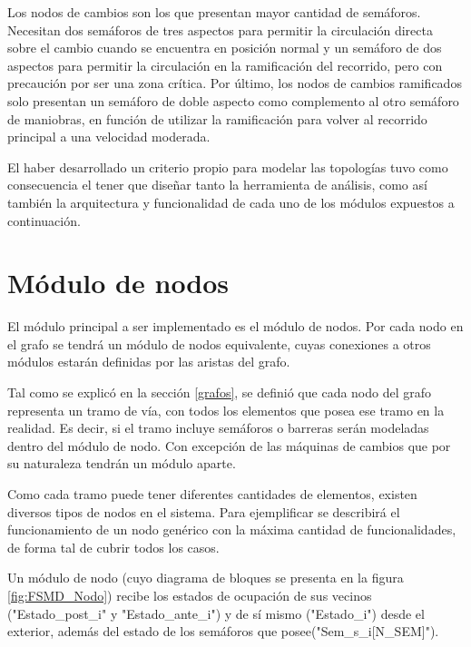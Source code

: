 	Los nodos de cambios son los que presentan mayor cantidad de semáforos. Necesitan dos semáforos de tres aspectos para permitir la circulación directa sobre el cambio cuando se encuentra en posición normal y un semáforo de dos aspectos para permitir la circulación en la ramificación del recorrido, pero con precaución por ser una zona crítica. Por último, los nodos de cambios ramificados solo presentan un semáforo de doble aspecto como complemento al otro semáforo de maniobras, en función de utilizar la ramificación para volver al recorrido principal a una velocidad moderada.
	
	El haber desarrollado un criterio propio para modelar las topologías tuvo como consecuencia el tener que diseñar tanto la herramienta de análisis, como así también la arquitectura y funcionalidad de cada uno de los módulos expuestos a continuación.	
	
\section{Módulo de nodos}

	El módulo principal a ser implementado es el módulo de nodos. Por cada nodo en el grafo se tendrá un módulo de nodos equivalente, cuyas conexiones a otros módulos estarán definidas por las aristas del grafo.
	
	Tal como se explicó en la sección \ref{grafos}, se definió que cada nodo del grafo representa un tramo de vía, con todos los elementos que posea ese tramo en la realidad. Es decir, si el tramo incluye semáforos o barreras serán modeladas dentro del módulo de nodo. Con excepción de las máquinas de cambios que por su naturaleza tendrán un módulo aparte.	
	
	Como cada tramo puede tener diferentes cantidades de elementos, existen diversos tipos de nodos en el sistema. Para ejemplificar se describirá el funcionamiento de un nodo genérico con la máxima cantidad de funcionalidades, de forma tal de cubrir todos los casos.
	
	Un módulo de nodo (cuyo diagrama de bloques se presenta en la figura \ref{fig:FSMD_Nodo}) recibe los estados de ocupación de sus vecinos ("Estado\_post\_i" y "Estado\_ante\_i") y de sí mismo ("Estado\_i") desde el exterior, además del estado de los semáforos que posee("Sem\_s\_i[N\_SEM]"). 
	
